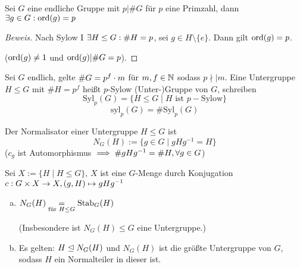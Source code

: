 \documentclass[a4paper]{report}
\begin{document}
\begin{kor}
  Sei $G$ eine endliche Gruppe mit $p | \#G$ für $p$ eine Primzahl, dann $\exists g \in G : \operatorname{ord}(g) = p$
  \begin{proof}[Beweis]
    Nach Sylow I $\exists H \le G : \#H = p$, sei $g \in H \setminus \{e\}$. Dann gilt $\operatorname{ord}(g) = p$.

    ($\operatorname{ord}(g) \ne 1$ und $\operatorname{ord}(g) | \#G=p$).
  \end{proof}
\end{kor}

\begin{defi}
  Sei $G$ endlich, gelte $\#G = p^{f} \cdot m$ für $m, f \in \mathbb{N}$ sodass $p \nmid | m$. Eine Untergruppe $H \le G$ mit $\#H = p^{f}$ heißt $p$-Sylow (Unter-)Gruppe von $G$, schreiben \[\mathrm{Syl}_{p}(G) = \{H \le G \mid H \text{ ist }p-\text{Sylow}\}\]
  \[\mathrm{syl}_p(G) = \#\mathrm{Syl}_{p}(G)\]
\end{defi}

\begin{defi}
  Der Normalisator einer Untergruppe $H \le G$ ist \[N_{G}(H):=\{g \in G \mid gHg^{-1} = H\}\]
  ($c_{g}$ ist Automorphismus $\implies \#gHg^{-1} = \#H, \forall g \in G$)
\end{defi}


\begin{int*}
Sei $X:= \{H \mid H \le G\}$, $X$ ist eine $G$-Menge durch Konjugation $c: G \times X \to X, (g, H) \mapsto gHg^{-1}$
\end{int*}


\begin{prop}[Übung]
\begin{enumerate}[(a)]
  \item $N_{G}(H) \underset{\text{für }H \le G} = \operatorname{Stab}_{G}(H)$

        (Insbesondere ist $N_{G}(H) \le G$ eine Untergruppe.)
  \item Es gelten: $H \trianglelefteq N_{G}(H)$ und $N_{G}(H)$ ist die größte Untergruppe von $G$, sodass $H$ ein Normalteiler in dieser ist.
\end{enumerate}
\end{prop}
\end{document}
